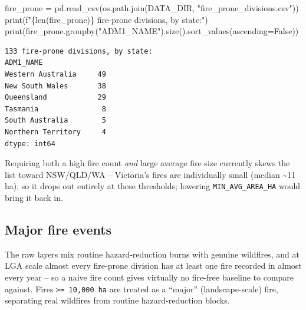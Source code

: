 \documentclass[
  letterpaper,
  DIV=11,
  numbers=noendperiod]{scrartcl}
\newenvironment{Shaded}{\begin{snugshade}}{\end{snugshade}}
\newcommand{\BuiltInTok}[1]{\textcolor[rgb]{0.00,0.23,0.31}{#1}}
\newcommand{\NormalTok}[1]{\textcolor[rgb]{0.00,0.23,0.31}{#1}}
\newcommand{\OperatorTok}[1]{\textcolor[rgb]{0.37,0.37,0.37}{#1}}
\newcommand{\SpecialCharTok}[1]{\textcolor[rgb]{0.37,0.37,0.37}{#1}}
\newcommand{\SpecialStringTok}[1]{\textcolor[rgb]{0.13,0.47,0.30}{#1}}
\newcommand{\StringTok}[1]{\textcolor[rgb]{0.13,0.47,0.30}{#1}}
\newcommand{\VariableTok}[1]{\textcolor[rgb]{0.07,0.07,0.07}{#1}}
\begin{document}
\begin{Shaded}
\begin{Highlighting}[]
\NormalTok{fire\_prone }\OperatorTok{=}\NormalTok{ pd.read\_csv(os.path.join(DATA\_DIR, }\StringTok{"fire\_prone\_divisions.csv"}\NormalTok{))}
\BuiltInTok{print}\NormalTok{(}\SpecialStringTok{f"}\SpecialCharTok{\{}\BuiltInTok{len}\NormalTok{(fire\_prone)}\SpecialCharTok{\}}\SpecialStringTok{ fire{-}prone divisions, by state:"}\NormalTok{)}
\BuiltInTok{print}\NormalTok{(fire\_prone.groupby(}\StringTok{"ADM1\_NAME"}\NormalTok{).size().sort\_values(ascending}\OperatorTok{=}\VariableTok{False}\NormalTok{))}
\end{Highlighting}
\end{Shaded}

\begin{verbatim}
133 fire-prone divisions, by state:
ADM1_NAME
Western Australia     49
New South Wales       38
Queensland            29
Tasmania               8
South Australia        5
Northern Territory     4
dtype: int64
\end{verbatim}

Requiring both a high fire count \emph{and} large average fire size
currently skews the list toward NSW/QLD/WA -- Victoria's fires are
individually small (median \textasciitilde11 ha), so it drops out
entirely at these thresholds; lowering \texttt{MIN\_AVG\_AREA\_HA} would
bring it back in.

\subsection{Major fire events}\label{major-fire-events}

The raw layers mix routine hazard-reduction burns with genuine
wildfires, and at LGA scale almost every fire-prone division has at
least one fire recorded in almost every year -- so a naive fire count
gives virtually no fire-free baseline to compare against. Fires
\texttt{\textgreater{}=\ 10,000\ ha} are treated as a ``major''
(landscape-scale) fire, separating real wildfires from routine
hazard-reduction blocks.
\end{document}

